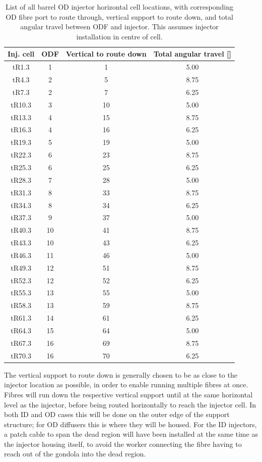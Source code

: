 \documentclass[a4paper,11pt]{article}
\begin{document}
\begin{table}
\centering
\begin{tabular}{cccc}\toprule
Inj. cell	&	ODF	&	Vertical to route down	&	Total angular travel	[\degree ]	\\ \midrule
tR1.3		&	1	&		1					&		5.00		\\
tR4.3		&	2	&		5					&		8.75		\\
tR7.3		&	2	&		7					&		6.25		\\
tR10.3		&	3	&		10					&		5.00		\\
tR13.3		&	4	&		15					&		8.75		\\
tR16.3		&	4	&		16					&		6.25		\\
tR19.3		&	5	&		19					&		5.00		\\
tR22.3		&	6	&		23					&		8.75		\\
tR25.3		&	6	&		25					&		6.25		\\
tR28.3		&	7	&		28					&		5.00		\\
tR31.3		&	8	&		33					&		8.75		\\
tR34.3		&	8	&		34					&		6.25		\\
tR37.3		&	9	&		37					&		5.00		\\
tR40.3		&	10	&		41					&		8.75		\\
tR43.3		&	10	&		43					&		6.25		\\
tR46.3		&	11	&		46					&		5.00		\\
tR49.3		&	12	&		51					&		8.75		\\
tR52.3		&	12	&		52					&		6.25		\\
tR55.3		&	13	&		55					&		5.00		\\
tR58.3		&	13	&		59					&		8.75		\\
tR61.3		&	14	&		61					&		6.25		\\
tR64.3		&	15	&		64					&		5.00		\\
tR67.3		&	16	&		69					&		8.75		\\
tR70.3		&	16	&		70					&		6.25		\\ \bottomrule
\end{tabular}
\caption{List of all barrel OD injector horizontal cell locations, with corresponding OD fibre port to route through, vertical support to route down, and total angular travel between ODF and injector. This assumes injector installation in centre of cell.}\label{tab:barrelInjPortsOD}
\end{table}
The vertical support to route down is generally chosen to be as close to the injector location as possible, in order to enable running multiple fibres at once. Fibres will run down the respective vertical support until at the same horizontal level as the injector, before being routed horizontally to reach the injector cell. In both ID and OD cases this will be done on the outer edge of the support structure; for OD diffusers this is where they will be housed. For the ID injectors, a patch cable to span the dead region will have been installed at the same time as the injector housing itself, to avoid the worker connecting the fibre having to reach out of the gondola into the dead region.
\end{document}
